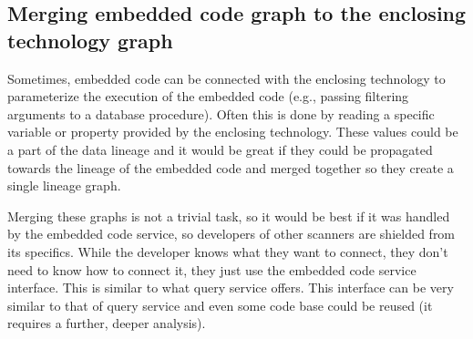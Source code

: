 \subsection{Merging embedded code graph to the enclosing technology graph}
Sometimes, embedded code can be connected with the enclosing technology to parameterize the execution of the embedded code (e.g., passing filtering arguments to a database procedure). Often this is done by reading a specific variable or property provided by the enclosing technology. These values could be a part of the data lineage and it would be great if they could be propagated towards the lineage of the embedded code and merged together so they create a single lineage graph. 
\par
Merging these graphs is not a trivial task, so it would be best if it was handled by the embedded code service, so developers of other scanners are shielded from its specifics. While the developer knows what they want to connect, they don’t need to know how to connect it, they just use the embedded code service interface. This is similar to what query service offers. This interface can be very similar to that of query service and even some code base could be reused (it requires a further, deeper analysis). 

